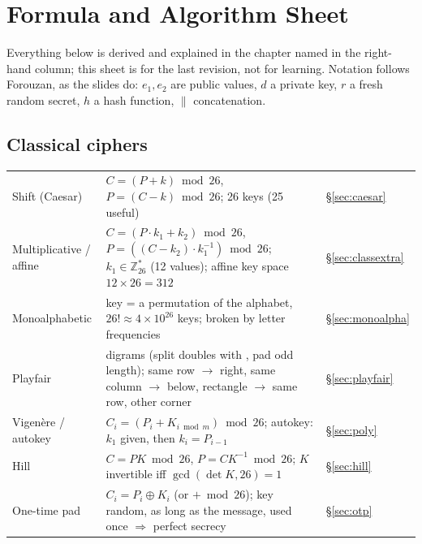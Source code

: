 \clearpage
\section{Formula and Algorithm Sheet}\label{sec:formulas}
Everything below is derived and explained in the chapter named in the right-hand column; this sheet is for the last revision, not for learning. Notation follows Forouzan, as the slides do: $e_1, e_2$ are public values, $d$ a private key, $r$ a fresh random secret, $h$ a hash function, $\|$ concatenation.

\providecommand{\fsrow}[3]{#1 & #2 & \footnotesize #3\\}

\subsection*{Classical ciphers}
{\small\renewcommand{\arraystretch}{1.18}\noindent
\begin{tabularx}{\textwidth}{@{}p{} X l@{}}
\toprule
\fsrow{Shift (Caesar)}{$C = (P + k) \bmod 26$, $P = (C - k) \bmod 26$; 26 keys (25 useful)}{\S\ref{sec:caesar}}
\fsrow{Multiplicative / affine}{$C = (P \cdot k_1 + k_2) \bmod 26$, $P = ((C - k_2) \cdot k_1^{-1}) \bmod 26$; $k_1 \in \mathbb{Z}_{26}^*$ (12 values); affine key space $12 \times 26 = 312$}{\S\ref{sec:classextra}}
\fsrow{Monoalphabetic}{key = a permutation of the alphabet, $26! \approx 4 \times 10^{26}$ keys; broken by letter frequencies}{\S\ref{sec:monoalpha}}
\fsrow{Playfair}{digrams (split doubles with \ttx{x}, pad odd length); same row $\to$ right, same column $\to$ below, rectangle $\to$ same row, other corner}{\S\ref{sec:playfair}}
\fsrow{Vigen\`ere / autokey}{$C_i = (P_i + K_{i \bmod m}) \bmod 26$; autokey: $k_1$ given, then $k_i = P_{i-1}$}{\S\ref{sec:poly}}
\fsrow{Hill}{$C = P K \bmod 26$, $P = C K^{-1} \bmod 26$; $K$ invertible iff $\gcd(\det K, 26) = 1$}{\S\ref{sec:hill}}
\fsrow{One-time pad}{$C_i = P_i \oplus K_i$ (or $+ \bmod 26$); key random, as long as the message, used once $\Rightarrow$ perfect secrecy}{\S\ref{sec:otp}}
\bottomrule
\end{tabularx}\par}

